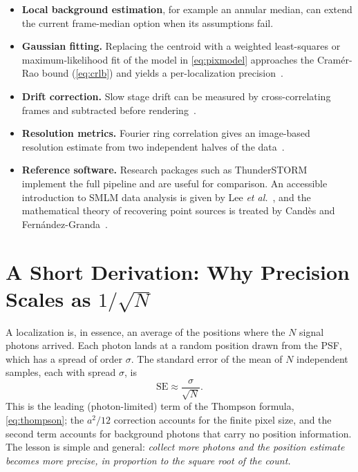 \documentclass[11pt,a4paper]{article}
\begin{document}
\begin{itemize}
  \item \textbf{Local background estimation}, for example an annular median,
        can extend the current frame-median option when its assumptions fail.
  \item \textbf{Gaussian fitting.} Replacing the centroid with a weighted
        least-squares or maximum-likelihood fit of the model in
        \cref{eq:pixmodel} approaches the Cram\'er-Rao bound
        (\cref{eq:crlb}) and yields a per-localization
        precision~\cite{mortensen2010, small2014}.
  \item \textbf{Drift correction.} Slow stage drift can be measured by
        cross-correlating frames and subtracted before
        rendering~\cite{guizar2008}.
  \item \textbf{Resolution metrics.} Fourier ring correlation gives an
        image-based resolution estimate from two independent halves of the
        data~\cite{prakash2024}.
  \item \textbf{Reference software.} Research packages such as
        ThunderSTORM~\cite{ovesny2014} implement the full pipeline and are
        useful for comparison. An accessible introduction to SMLM data analysis
        is given by Lee \emph{et al.}~\cite{lee2017}, and the mathematical
        theory of recovering point sources is treated by Cand\`es and
        Fern\'andez-Granda~\cite{candes2014}.
\end{itemize}

\appendix

\section{A Short Derivation: Why Precision Scales as
         \texorpdfstring{$1/\sqrt{N}$}{1/sqrt(N)}}
\label{sec:appderiv}

\begin{csderiv}
A localization is, in essence, an average of the positions where the $N$
signal photons arrived. Each photon lands at a random position drawn from the
PSF, which has a spread of order $\sigma$. The standard error of the mean of $N$
independent samples, each with spread $\sigma$, is
\begin{equation*}
  \mathrm{SE} \approx \frac{\sigma}{\sqrt{N}}.
\end{equation*}
This is the leading (photon-limited) term of the Thompson formula,
\cref{eq:thompson}; the $a^2/12$ correction accounts for the finite pixel size,
and the second term accounts for background photons that carry no position
information. The lesson is simple and general: \emph{collect more photons and
the position estimate becomes more precise, in proportion to the square root of the count.}
\end{csderiv}
\end{document}
